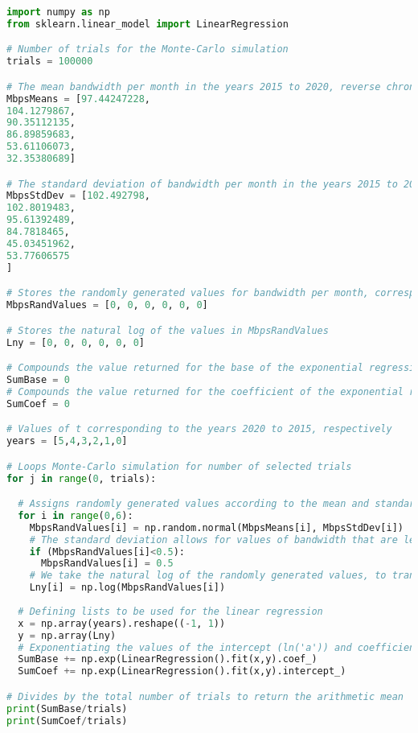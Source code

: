 \documentclass[12pt]{article}
\begin{document}
\begin{lstlisting}[language=python]
import numpy as np
from sklearn.linear_model import LinearRegression

# Number of trials for the Monte-Carlo simulation
trials = 100000

# The mean bandwidth per month in the years 2015 to 2020, reverse chronological order; data for urban U.K. used
MbpsMeans = [97.44247228,
104.1279867,
90.35112135,
86.89859683,
53.61106073,
32.35380689]

# The standard deviation of bandwidth per month in the years 2015 to 2020, reverse chronological order; data for urban U.K. used
MbpsStdDev = [102.492798,
102.8019483,
95.61392489,
84.7818465,
45.03451962,
53.77606575
]

# Stores the randomly generated values for bandwidth per month, corresponding to the years 2020 to 2015, respectively
MbpsRandValues = [0, 0, 0, 0, 0, 0]

# Stores the natural log of the values in MbpsRandValues
Lny = [0, 0, 0, 0, 0, 0]

# Compounds the value returned for the base of the exponential regression in each trial
SumBase = 0
# Compounds the value returned for the coefficient of the exponential regression in each trial
SumCoef = 0

# Values of t corresponding to the years 2020 to 2015, respectively
years = [5,4,3,2,1,0]

# Loops Monte-Carlo simulation for number of selected trials
for j in range(0, trials):

  # Assigns randomly generated values according to the mean and standard deviation of each year
  for i in range(0,6):
    MbpsRandValues[i] = np.random.normal(MbpsMeans[i], MbpsStdDev[i])
    # The standard deviation allows for values of bandwidth that are less than 0; however, since the realistic minimum for bandwidth is 0.5 Mbps, all data below this value is replaced with 0.5 Mbps
    if (MbpsRandValues[i]<0.5):
      MbpsRandValues[i] = 0.5
    # We take the natural log of the randomly generated values, to transform the exponential regression model of coefficient 'a' and base 'b' to a linear regression model of intercept ln('a') and coefficient ln('b')
    Lny[i] = np.log(MbpsRandValues[i])
  
  # Defining lists to be used for the linear regression
  x = np.array(years).reshape((-1, 1))
  y = np.array(Lny)
  # Exponentiating the values of the intercept (ln('a')) and coefficient (ln('b')) returns the values of the coefficient of the exponential regression ('a') and the base ('b'), respectively
  SumBase += np.exp(LinearRegression().fit(x,y).coef_)
  SumCoef += np.exp(LinearRegression().fit(x,y).intercept_)

# Divides by the total number of trials to return the arithmetic mean
print(SumBase/trials)
print(SumCoef/trials)

\end{lstlisting}
\end{document}
